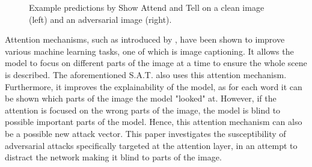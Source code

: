 \begin{figure}[h]
    \centering
    \vspace{\floatsep}
    \caption{Example predictions by Show Attend and Tell on a clean image (left) and an adversarial image (right).}

\end{figure}

Attention mechanisms, such as introduced by \citeauthor{attention_bahdanau}, have been shown to improve various machine learning tasks, one of which is image captioning. It allows the model to focus on different parts of the image at a time to ensure the whole scene is described. The aforementioned S.A.T. also uses this attention mechanism. Furthermore, it improves the explainability of the model, as for each word it can be shown which parts of the image the model "looked" at. However, if the attention is focused on the wrong parts of the image, the model is blind to possible important parts of the model. Hence, this attention mechanism can also be a possible new attack vector. This paper investigates the susceptibility of adversarial attacks specifically targeted at the attention layer, in an attempt to distract the network making it blind to parts of the image.


